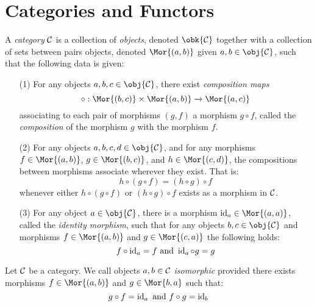 \section{Categories and Functors}\label{section_1.1}

\begin{definition}
  A \textit{category} $\mathcal{C}$ is a collection of \textit{objects},
  denoted $\obk{\Cc}$ together with a collection of sets
  between pairs objects, denoted $\Mor{(a,b)}$ given $a,b \in
  \obj{\Cc}$, such that the following data is given:
  \begin{enumerate}
    \item[(1)] For any objects $a,b,c \in \obj{\Cc}$, there exist
      \textit{composition maps}
      \begin{equation*}
        \circ:\Mor{(b,c)} \times \Mor{(a,b)} \xrightarrow{} \Mor{(a,c)}
      \end{equation*}
      associating to each pair of
      morphisms $(g,f)$ a morphism $g \circ f$, called the
      \textit{composition} of the morphism $g$ with the morphism $f$.

    \item[(2)] For any objects $a,b,c,d \in \obj{\Cc}$, and for any
      morphisms $f \in \Mor{(a,b)}$, $g \in \Mor{(b,c)}$, and $h \in
      \Mor{(c,d)}$, the compositions between morphisms associate
      wherever they exist. That is:
      \begin{equation*}
        h \circ (g \circ f)=(h \circ g) \circ f
      \end{equation*}
      whenever either $h \circ (g \circ f)$ or $(h \circ g) \circ f$
      exists as a morphism in $\mathcal{C}$.

    \item[(3)] For any object $a \in \obj{\Cc}$, there is a morphism
      $\id_a \in \Mor{(a,a)}$, called the \textit{identity morphism},
      such that for any objects $b,c \in \obj{\Cc}$ and morphisms $f
      \in \Mor{(a,b)}$ and $g \in \Mor{(c,a)}$ the following holds:
      \begin{equation*}
        f \circ \operatorname{id}_a=f \text{ and } \operatorname{id}_a \circ g=g
      \end{equation*}
  \end{enumerate}
\end{definition}

\begin{definition}
  Let $\mathcal{C}$ be a category. We call objects $a,b \in \mathcal{C}$
  \textit{isomorphic} provided there exists morphisms $f \in
  \Mor{(a,b)}$ and $g \in \Mor{b,a}$ such that:
  \begin{equation*}
    g \circ f=\operatorname{id}_a \text{ and } f \circ g=\operatorname{id}_b
  \end{equation*}
\end{definition}
